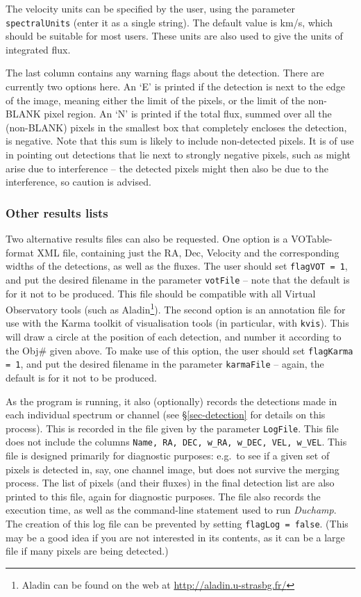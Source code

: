 \documentclass[12pt,a4paper]{article}
\newcommand{\eg}{e.g.\ }
\newcommand{\duchamp}{\emph{Duchamp}}
\begin{document}
The velocity units can be specified by the user, using the parameter
\texttt{spectralUnits} (enter it as a single string). The default value
is km/s, which should be suitable for most users. These units are also
used to give the units of integrated flux. 

The last column contains any warning flags about the detection. There
are currently two options here. An `E' is printed if the detection is
next to the edge of the image, meaning either the limit of the pixels,
or the limit of the non-BLANK pixel region. An `N' is printed if the
total flux, summed over all the (non-BLANK) pixels in the smallest box
that completely encloses the detection, is negative. Note that this
sum is likely to include non-detected pixels. It is of use in
pointing out detections that lie next to strongly negative pixels,
such as might arise due to interference -- the detected pixels might
then also be due to the interference, so caution is advised.

\subsubsection{Other results lists}

Two alternative results files can also be requested. One option is a
VOTable-format XML file, containing just the RA, Dec, Velocity and the
corresponding widths of the detections, as well as the fluxes. The
user should set \texttt{flagVOT = 1}, and put the desired filename in the
parameter \texttt{votFile} -- note that the default is for it not to be
produced. This file should be compatible with all Virtual Observatory
tools (such as Aladin\footnote{ Aladin can be found on the web at
\href{http://aladin.u-strasbg.fr/}{http://aladin.u-strasbg.fr/}}). The
second option is an annotation file for use with the Karma toolkit of
visualisation tools (in particular, with \texttt{kvis}). This will draw a
circle at the position of each detection, and number it according to
the Obj\# given above. To make use of this option, the user should
set \texttt{flagKarma = 1}, and put the desired filename in the parameter
\texttt{karmaFile} -- again, the default is for it not to be produced.

As the program is running, it also (optionally) records the detections
made in each individual spectrum or channel (see \S\ref{sec-detection}
for details on this process). This is recorded in the file given by
the parameter \texttt{LogFile}. This file does not include the columns
\texttt{Name, RA, DEC, w\_RA, w\_DEC, VEL, w\_VEL}. This file is
designed primarily for diagnostic purposes: \eg to see if a given set
of pixels is detected in, say, one channel image, but does not survive
the merging process. The list of pixels (and their fluxes) in the
final detection list are also printed to this file, again for
diagnostic purposes. The file also records the execution time, as well
as the command-line statement used to run \duchamp. The creation of
this log file can be prevented by setting \texttt{flagLog =
false}. (This may be a good idea if you are not interested in its
contents, as it can be a large file if many pixels are being
detected.)
\end{document}
